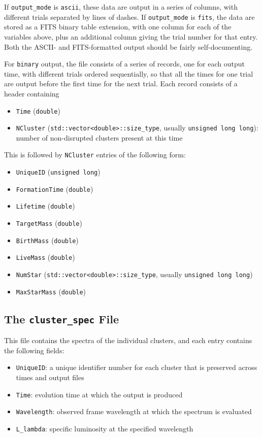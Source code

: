 \documentclass[12pt]{article}
\begin{document}
If \verb=output_mode= is \verb=ascii=, these data are output in a series of columns, with different trials separated by lines of dashes. If \verb=output_mode= is \verb=fits=, the data are stored as a FITS binary table extension, with one column for each of the variables above, plus an additional column giving the trial number for that entry. Both the ASCII- and FITS-formatted output should be fairly self-documenting.

For \verb=binary= output, the file consists of a series of records, one for each output time, with different trials ordered sequentially, so that all the times for one trial are output before the first time for the next trial. Each record consists of a header containing
\begin{itemize}
\item \verb=Time= (\verb=double=)
\item \verb=NCluster= (\verb=std::vector<double>::size_type=, usually \verb=unsigned long long=): number of non-disrupted clusters present at this time
\end{itemize}
This is followed by \verb=NCluster= entries of the following form:
\begin{itemize}
\item \verb=UniqueID= (\verb=unsigned long=)
\item \verb=FormationTime= (\verb=double=)
\item \verb=Lifetime= (\verb=double=)
\item \verb=TargetMass= (\verb=double=)
\item \verb=BirthMass= (\verb=double=)
\item \verb=LiveMass= (\verb=double=)
\item \verb=NumStar= (\verb=std::vector<double>::size_type=, usually \verb=unsigned long long=)
\item \verb=MaxStarMass= (\verb=double=)
\end{itemize}

\subsection{The \texttt{cluster\_spec} File}

This file contains the spectra of the individual clusters, and each entry contains the following fields:
\begin{itemize}
\item \verb=UniqueID=: a unique identifier number for each cluster that is preserved across times and output files
\item \verb=Time=: evolution time at which the output is produced
\item \verb=Wavelength=: observed frame wavelength at which the spectrum is evaluated
\item \verb=L_lambda=: specific luminosity at the specified wavelength
\end{itemize}
\end{document}
